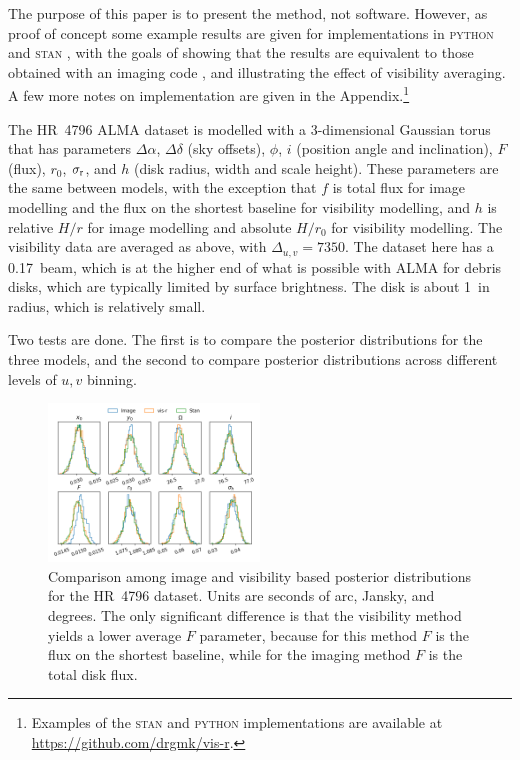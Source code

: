 \documentclass[fleqn,usenatbib]{mnras}
\begin{document}
The purpose of this paper is to present the method, not software. However, as proof of concept some example results are given for implementations in \textsc{python} and \textsc{stan} \citep{2017JSS....76....1C}, with the goals of showing that the results are equivalent to those obtained with an imaging code \citep[e.g.][]{2021MNRAS.504.4497C}, and illustrating the effect of visibility averaging. A few more notes on implementation are given in the Appendix.\footnote{Examples of the \textsc{stan} and \textsc{python} implementations are available at \href{https://github.com/drgmk/vis-r}{https://github.com/drgmk/vis-r}.}


The HR~4796 ALMA dataset is modelled with a 3-dimensional Gaussian torus that has parameters $\Delta \alpha$, $\Delta \delta$ (sky offsets), $\phi$, $i$ (position angle and inclination), $F$ (flux), $r_0$, $\sigma_{\rm r}$, and $h$ (disk radius, width and scale height). These parameters are the same between models, with the exception that $f$ is total flux for image modelling and the flux on the shortest baseline for visibility modelling, and $h$ is relative $H/r$ for image modelling and absolute $H/r_0$ for visibility modelling. The visibility data are averaged as above, with $\Delta_{u,v} = 7350$. The dataset here has a 0.17\arcsec~beam, which is at the higher end of what is possible with ALMA for debris disks, which are typically limited by surface brightness. The disk is about 1\arcsec~in radius, which is relatively small. 

Two tests are done. The first is to compare the posterior distributions for the three models, and the second to compare posterior distributions across different levels of $u,v$ binning.

\begin{figure}
    \centering
    \includegraphics[width=0.5\textwidth]{comp.png}
    \caption{Comparison among image and visibility based posterior distributions for the HR~4796 dataset. Units are seconds of arc, Jansky, and degrees. The only significant difference is that the visibility method yields a lower average $F$ parameter, because for this method $F$ is the flux on the shortest baseline, while for the imaging method $F$ is the total disk flux.}
    \label{fig:comp}
\end{figure}
\end{document}

